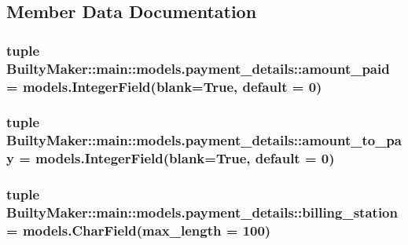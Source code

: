\subsection{\-Member \-Data \-Documentation}
\hypertarget{classBuiltyMaker_1_1main_1_1models_1_1payment__details_a24ec14ad68b3988198bb6e609450287f}{
\subsubsection[{amount\-\_\-paid}]{\setlength{\rightskip}{0pt plus 5cm}tuple {\bf \-Builty\-Maker\-::main\-::models.\-payment\-\_\-details\-::amount\-\_\-paid} = models.\-Integer\-Field(blank=\-True, default = 0)}}\label{classBuiltyMaker_1_1main_1_1models_1_1payment__details_a24ec14ad68b3988198bb6e609450287f}
\hypertarget{classBuiltyMaker_1_1main_1_1models_1_1payment__details_ab2111d4c298430e54fdfe975916f9618}{
\subsubsection[{amount\-\_\-to\-\_\-pay}]{\setlength{\rightskip}{0pt plus 5cm}tuple {\bf \-Builty\-Maker\-::main\-::models.\-payment\-\_\-details\-::amount\-\_\-to\-\_\-pay} = models.\-Integer\-Field(blank=\-True, default = 0)}}\label{classBuiltyMaker_1_1main_1_1models_1_1payment__details_ab2111d4c298430e54fdfe975916f9618}
\hypertarget{classBuiltyMaker_1_1main_1_1models_1_1payment__details_ae81eb8266f116bdab4202c806c9756e0}{
\subsubsection[{billing\-\_\-station}]{\setlength{\rightskip}{0pt plus 5cm}tuple {\bf \-Builty\-Maker\-::main\-::models.\-payment\-\_\-details\-::billing\-\_\-station} = models.\-Char\-Field(max\-\_\-length = 100)}}\label{classBuiltyMaker_1_1main_1_1models_1_1payment__details_ae81eb8266f116bdab4202c806c9756e0}
